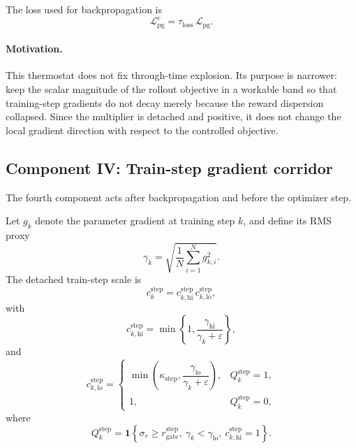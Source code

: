\documentclass[11pt]{article}
\newcommand{\1}{\mathbf{1}}
\begin{document}
The loss used for backpropagation is
\begin{equation}
  \mathcal{L}_{\mathrm{pg}}^{c} = \tau_{\mathrm{loss}} \, \mathcal{L}_{\mathrm{pg}}.
\end{equation}

\paragraph{Motivation.}
This thermostat does not fix through-time explosion. Its purpose is narrower: keep the scalar magnitude of the rollout objective in a workable band so that training-step gradients do not decay merely because the reward dispersion collapsed. Since the multiplier is detached and positive, it does not change the local gradient direction with respect to the controlled objective.

\subsection{Component IV: Train-step gradient corridor}
The fourth component acts after backpropagation and before the optimizer step.

Let $g_k$ denote the parameter gradient at training step $k$, and define its RMS proxy
\begin{equation}
  \gamma_k = \sqrt{\frac{1}{N}\sum_{i=1}^{N} g_{k,i}^2}.
\end{equation}
The detached train-step scale is
\begin{equation}
  c_k^{\mathrm{step}} = c_{k,\mathrm{hi}}^{\mathrm{step}} \, c_{k,\mathrm{lo}}^{\mathrm{step}},
\end{equation}
with
\begin{equation}
  c_{k,\mathrm{hi}}^{\mathrm{step}}
  =
  \min\!\left\{1, \frac{\gamma_{\mathrm{hi}}}{\gamma_k + \varepsilon}\right\},
\end{equation}
and
\begin{equation}
  c_{k,\mathrm{lo}}^{\mathrm{step}}
  =
  \begin{cases}
    \min\!\left(\kappa_{\mathrm{step}}, \dfrac{\gamma_{\mathrm{lo}}}{\gamma_k + \varepsilon}\right),
      & Q_k^{\mathrm{step}} = 1, \\
    1, & Q_k^{\mathrm{step}} = 0,
  \end{cases}
\end{equation}
where
\begin{equation}
  Q_k^{\mathrm{step}}
  =
  \1\!\left\{
    \sigma_r \ge r_{\mathrm{gate}}^{\mathrm{step}},
    \ \gamma_k < \gamma_{\mathrm{lo}},
    \ c_{k,\mathrm{hi}}^{\mathrm{step}} = 1
  \right\}.
\end{equation}
\end{document}
